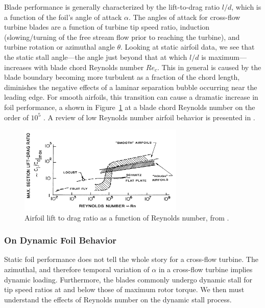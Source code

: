 \documentclass[energies,article,accept,moreauthors,pdftex,12pt,a4paper]{mdpi}
\begin{document}
Blade performance is generally characterized by the lift-to-drag ratio $l/d$,
which is a function of the foil's angle of attack $\alpha$. The angles of attack
for cross-flow turbine blades are a function of turbine tip speed ratio,
induction (slowing/turning of the free stream flow prior to reaching the
turbine), and turbine rotation or azimuthal angle $\theta$. Looking at static
airfoil data, we see that the static stall angle---the angle just beyond that at
which $l/d$ is maximum---increases with blade chord Reynolds number $Re_c$. This
in general is caused by the blade boundary becoming more turbulent as a fraction
of the chord length, diminishes the negative effects of a laminar separation
bubble occurring near the leading edge. For smooth airfoils, this transition can
cause a dramatic increase in foil performance, a shown in
Figure~\ref{fig:McMasters} at a blade chord Reynolds number on the order of
$10^5$ \cite{McMasters1980}. A review of low Reynolds number airfoil behavior is
presented in \cite{Lissaman1983}.

\begin{figure}[ht]
\centering
\includegraphics[width=0.7\textwidth]{figures/McMasters-Henderson-1980}
\caption{Airfoil lift to drag ratio as a function of Reynolds number, from 
\cite{McMasters1980}.}
\label{fig:McMasters}
\end{figure}

\subsubsection{On Dynamic Foil Behavior}

Static foil performance does not tell the whole story for a cross-flow turbine.
The azimuthal, and therefore temporal variation of $\alpha$ in a cross-flow
turbine implies dynamic loading. Furthermore, the blades commonly undergo
dynamic stall for tip speed ratios at and below those of maximum rotor
torque\cite{Para2002}. We then must understand the effects of Reynolds number on
the dynamic stall process.
\end{document}
